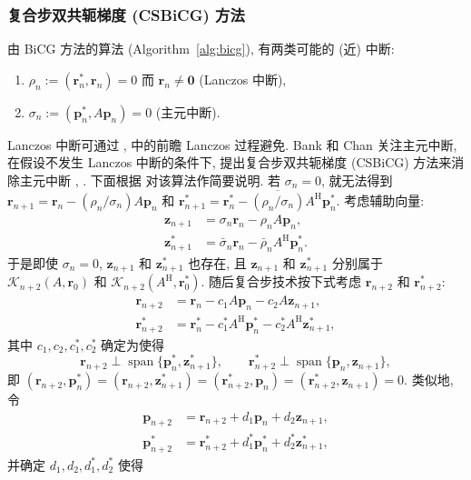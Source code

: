\subsubsection{{复合步双共轭梯度 (CSBiCG) 方法}}\label{subsec:composite-step-bicg}
{由 BiCG 方法的算法 (Algorithm\ \ref{alg:bicg}), 有两类可能的 (近) 中断:}
\begin{enumerate}
\item $\rho_n:=(\bm r_n^{*},\bm r_n)=0$ {而 $\bm r_n\ne\bm0$ (Lanczos 中断),}
\item $\sigma_n:=(\bm p_n^{*},A\bm p_n)=0$ ({主元中断}).
\end{enumerate}
{Lanczos 中断可通过 ,  中的前瞻 Lanczos 过程避免. Bank 和 Chan 关注主元中断, 在假设不发生 Lanczos 中断的条件下, 提出复合步双共轭梯度 (CSBiCG) 方法来消除主元中断 , . 下面根据  对该算法作简要说明.}
{若 $\sigma_n=0$, 就无法得到 $\bm r_{n+1}=\bm r_n-(\rho_n/\sigma_n)A\bm p_n$ 和 $\bm r_{n+1}^{*}=\bm r_n^{*}-\overline{(\rho_n/\sigma_n)}A^{\mathrm H}\bm p_n^{*}$. 考虑辅助向量:}
\[\begin{aligned}\bm z_{n+1}&=\sigma_n\bm r_n-\rho_nA\bm p_n,\\\bm z_{n+1}^{*}&=\bar\sigma_n\bm r_n-\bar\rho_nA^{\mathrm H}\bm p_n^{*}.\end{aligned}\]
{于是即使 $\sigma_n=0$, $\bm z_{n+1}$ 和 $\bm z_{n+1}^{*}$ 也存在, 且 $\bm z_{n+1}$ 和 $\bm z_{n+1}^{*}$ 分别属于 $\mathcal K_{n+2}(A,\bm r_0)$ 和 $\mathcal K_{n+2}(A^{\mathrm H},\bm r_0^{*})$. 随后复合步技术按下式考虑 $\bm r_{n+2}$ 和 $\bm r_{n+2}^{*}$:}
\[\begin{aligned}\bm r_{n+2}&=\bm r_n-c_1A\bm p_n-c_2A\bm z_{n+1},\\\bm r_{n+2}^{*}&=\bm r_n^{*}-c_1^{*}A^{\mathrm H}\bm p_n^{*}-c_2^{*}A^{\mathrm H}\bm z_{n+1}^{*},\end{aligned}\]
{其中 $c_1,c_2,c_1^{*},c_2^{*}$ 确定为使得}
\[\bm r_{n+2}\perp\operatorname{span}\{\bm p_n^{*},\bm z_{n+1}^{*}\},\qquad\bm r_{n+2}^{*}\perp\operatorname{span}\{\bm p_n,\bm z_{n+1}\},\]
{即 $(\bm r_{n+2},\bm p_n^{*})=(\bm r_{n+2},\bm z_{n+1}^{*})=(\bm r_{n+2}^{*},\bm p_n)=(\bm r_{n+2}^{*},\bm z_{n+1})=0$. 类似地, 令}
\[\begin{aligned}\bm p_{n+2}&=\bm r_{n+2}+d_1\bm p_n+d_2\bm z_{n+1},\\\bm p_{n+2}^{*}&=\bm r_{n+2}^{*}+d_1^{*}\bm p_n^{*}+d_2^{*}\bm z_{n+1}^{*},\end{aligned}\]
{并确定 $d_1,d_2,d_1^{*},d_2^{*}$ 使得}
